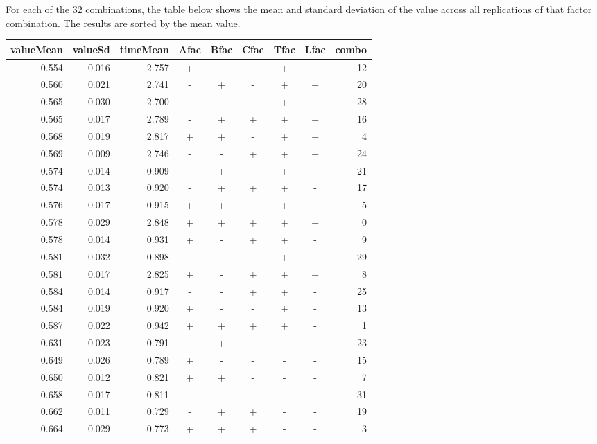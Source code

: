\documentclass[11pt]{article}
\begin{document}
For each of the $32$ combinations, the table below shows the mean and
standard deviation of the value across all replications of that factor
combination.  The results are sorted by the mean value.

\begin{table}[ht]
\centering
\begin{tabular}{rrrcccccr}
  \hline
valueMean & valueSd & timeMean & Afac & Bfac & Cfac & Tfac & Lfac & combo \\ 
  \hline
0.554 & 0.016 & 2.757 & + & - & - & + & + & 12 \\ 
  0.560 & 0.021 & 2.741 & - & + & - & + & + & 20 \\ 
  0.565 & 0.030 & 2.700 & - & - & - & + & + & 28 \\ 
  0.565 & 0.017 & 2.789 & - & + & + & + & + & 16 \\ 
  0.568 & 0.019 & 2.817 & + & + & - & + & + & 4 \\ 
  0.569 & 0.009 & 2.746 & - & - & + & + & + & 24 \\ 
  0.574 & 0.014 & 0.909 & - & + & - & + & - & 21 \\ 
  0.574 & 0.013 & 0.920 & - & + & + & + & - & 17 \\ 
  0.576 & 0.017 & 0.915 & + & + & - & + & - & 5 \\ 
  0.578 & 0.029 & 2.848 & + & + & + & + & + & 0 \\ 
  0.578 & 0.014 & 0.931 & + & - & + & + & - & 9 \\ 
  0.581 & 0.032 & 0.898 & - & - & - & + & - & 29 \\ 
  0.581 & 0.017 & 2.825 & + & - & + & + & + & 8 \\ 
  0.584 & 0.014 & 0.917 & - & - & + & + & - & 25 \\ 
  0.584 & 0.019 & 0.920 & + & - & - & + & - & 13 \\ 
  0.587 & 0.022 & 0.942 & + & + & + & + & - & 1 \\ 
  0.631 & 0.023 & 0.791 & - & + & - & - & - & 23 \\ 
  0.649 & 0.026 & 0.789 & + & - & - & - & - & 15 \\ 
  0.650 & 0.012 & 0.821 & + & + & - & - & - & 7 \\ 
  0.658 & 0.017 & 0.811 & - & - & - & - & - & 31 \\ 
  0.662 & 0.011 & 0.729 & - & + & + & - & - & 19 \\ 
  0.664 & 0.029 & 0.773 & + & + & + & - & - & 3 \\ 

\end{tabular}
\end{table}
\end{document}
